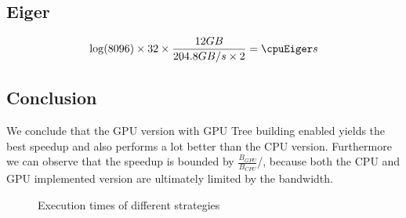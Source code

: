 \documentclass[]{article}
\begin{document}
\vspace{5mm}


\subsection{Eiger}

\pgfmathsetmacro{}

\begin{center}
	\begin{equation}
		\log(\d) \times \p \times \frac{ \s GB }{204.8 GB/s \times 2} = \cpuEiger s
	\end{equation}
\end{center}

\subsection{Conclusion}

We conclude that the GPU version with GPU Tree building enabled yields the best speedup and also performs a lot better than the CPU version. Furthermore we can observe that the speedup is bounded by $\frac{B_{GPU}}{B_{CPU}}$/, because both the CPU and GPU implemented version are ultimately limited by the bandwidth.

\begin{figure}[H]
	\begin{center}
	\end{center}

\caption{Execution times of different strategies}
\label{fig:exectimes}
\end{figure}
\end{document}
